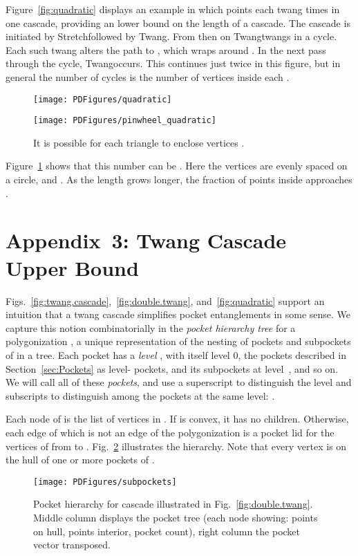 \pdfoutput=1  \documentclass{article}
\def\st{{\sc Stretch}}
\def\tw{{\sc Twang}}
\newcommand{\figlab}[1]{\label{fig:#1}}
\newcommand{\secref}[1]{\ref{sec:#1}}
\newcommand{\figref}[1]{\ref{fig:#1}}
\begin{document}
Figure~\figref{quadratic} displays an example in which 
 points each
twang  times in one cascade, providing an
 lower bound on the length of a cascade.
The cascade is initiated by \st followed by \tw.
From then on \tw twangs in a cycle.
Each such twang alters the path to ,
which wraps around .  In the next pass through the cycle,
\tw occurs.
This continues just twice in this figure,
but in general the number of cycles is the number of
 vertices inside each .
\begin{figure}[htbp]
\begin{minipage}[b]{0.47\linewidth}
\centering
\texttt{[image: PDFigures/quadratic]}
\caption{\st followed by \tw initiates a 
quadratic-length twang cascade.}
\figlab{quadratic}
\end{minipage}\hspace{0.06\linewidth}\begin{minipage}[b]{0.47\linewidth}
\centering
\texttt{[image: PDFigures/pinwheel\_quadratic]}
\caption{It is possible for each triangle 
to enclose  vertices .
}
\figlab{pinwheel_quadratic}
\end{minipage}
\end{figure}
Figure~\figref{pinwheel_quadratic} shows that this number can be .
Here the  vertices are evenly spaced on a circle,
and .
As the length  grows longer, the fraction of points
inside  approaches .


\section*{Appendix~3: Twang Cascade Upper Bound}
Figs.~\figref{twang.cascade},~\figref{double.twang}, and~\figref{quadratic}
support an
intuition that a twang cascade simplifies pocket entanglements in
some sense.
We capture this notion combinatorially in the \emph{pocket hierarchy tree} 
 for a polygonization ,
a unique representation of the nesting of
pockets and subpockets of  in a tree.
Each pocket has a \emph{level} , with  itself level 0,
the pockets
described in Section~\secref{Pockets} as level- pockets,
and its subpockets at level~, and so on.
We will call all of these \emph{pockets}, and use
a superscript to distinguish the level  and subscripts
to distinguish among the pockets at the same level:
.

Each node of 
is the list of vertices in .
If  is convex, it has no children.
Otherwise, each edge  of 
which is not an edge of the polygonization  is
a pocket lid for the vertices of  from  to .
Fig.~\figref{subpockets} illustrates the hierarchy.
Note that every vertex  is on the hull of one
or more pockets of .
\begin{figure}[htbp]
\centering
\texttt{[image: PDFigures/subpockets]}
\caption{Pocket hierarchy for cascade illustrated
in Fig.~\protect\figref{double.twang}.
Middle column displays the pocket tree
(each node showing:
points on hull, points interior,  pocket count), 
right column the pocket vector transposed.}
\figlab{subpockets}
\end{figure}
\end{document}
